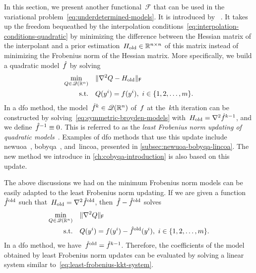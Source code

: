 In this section, we present another functional~$\mathcal{F}$ that can be used in the variational problem~\cref{eq:underdetermined-models}.
It is introduced by \citeauthor{Powell_2004b}~\cite{Powell_2004b}.
It takes up the freedom bequeathed by the interpolation conditions~\cref{eq:interpolation-conditions-quadratic} by minimizing the difference between the Hessian matrix of the interpolant and a prior estimation~$H_{\text{old}} \in \mathbb{R}^{n \times n}$ of this matrix instead of minimizing the Frobenius norm of the Hessian matrix.
More specifically, we build a quadratic model~$\objm$ by solving
\begin{subequations}
    \label{eq:symmetric-broyden-models}
    \begin{align}
        \min_{Q \in \mathscr{Q}(\mathbb{R}^n)} & \quad \lVert\nabla^2 Q - H_{\text{old}}\rVert_{\mathsf{F}}\\
        \text{s.t.}         & \quad Q(y^i) = f(y^i), ~ i \in \{1, 2, \dots, m\}.
    \end{align}
\end{subequations}
In a \gls{dfo} method, the model~$\objm[k] \in \qpoly$ of~$f$ at the~$k$th iteration can be constructed by solving~\cref{eq:symmetric-broyden-models} with~$H_{\text{old}} = \nabla^2 \objm[k - 1]$, and we define~$\objm[-1] \equiv 0$.
This is referred to as the \emph{least Frobenius norm updating of quadratic models}~\cite{Powell_2004b}.
Examples of \gls{dfo} methods that use this update include \gls{newuoa}~\cite{Powell_2006}, \gls{bobyqa}~\cite{Powell_2009}, and~\gls{lincoa}, presented in \cref{subsec:newuoa-bobyqa-lincoa}.
The new method we introduce in \cref{ch:cobyqa-introduction} is also based on this update.

The above discussions we had on the minimum Frobenius norm models can be easily adapted to the least Frobenius norm updating.
If we are given a function~$\objm[\text{old}]$ such that~$H_{\text{old}} = \nabla^2 \objm[\text{old}]$, then~$\objm - \objm[\text{old}]$ solves
\begin{subequations}
    \label{eq:symmetric-broyden-models-reformulation}
    \begin{align}
        \min_{Q \in \qpoly} & \quad \norm{\nabla^2 Q}_{\mathsf{F}}\\
        \text{s.t.}         & \quad Q(y^i) = \obj(y^i) - \objm[\text{old}](y^i), ~ i \in \set{1, 2, \dots, m}.
    \end{align}
\end{subequations}
In a \gls{dfo} method, we have~$\objm[\text{old}] = \objm[k - 1]$.
Therefore, the coefficients of the model obtained by least Frobenius norm updates can be evaluated by solving a linear system similar to~\cref{eq:least-frobenius-kkt-system}.

